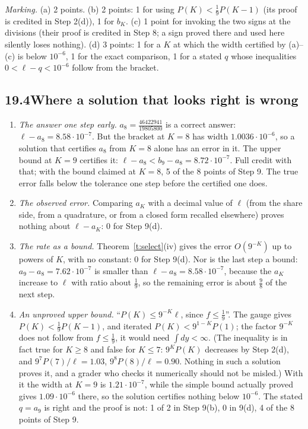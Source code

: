 \documentclass[11pt]{article}
\theoremstyle{plain}
\theoremstyle{definition}
\theoremstyle{remark}
\begin{document}
\smallskip\noindent\emph{Marking.} (a) 2 points. (b) 2 points: 1 for using $P(K)<\frac19P(K-1)$ (its proof is credited in Step 2(d)), 1 for $b_K$. (c) 1 point for invoking the two signs at the divisions (their proof is credited in Step 8; a sign proved there and used here silently loses nothing). (d) 3 points: 1 for a $K$ at which the width certified by (a)--(c) is below $10^{-6}$, 1 for the exact comparison, 1 for a stated $q$ whose inequalities $0<\ell-q<10^{-6}$ follow from the bracket.

\subsection*{19.4\quad Where a solution that looks right is wrong}

\begin{enumerate}[label=\arabic*.]
\item \emph{The answer one step early.} $a_8=\frac{46422941}{19805800}$ is a correct answer: $\ell-a_8=8.58\cdot10^{-7}$. But the bracket at $K=8$ has width $1.0036\cdot10^{-6}$, so a solution that certifies $a_8$ from $K=8$ alone has an error in it. The upper bound at $K=9$ certifies it: $\ell-a_8<b_9-a_8=8.72\cdot10^{-7}$. Full credit with that; with the bound claimed at $K=8$, 5 of the 8 points of Step 9. The true error falls below the tolerance one step before the certified one does.
\item \emph{The observed error.} Comparing $a_K$ with a decimal value of $\ell$ (from the share side, from a quadrature, or from a closed form recalled elsewhere) proves nothing about $\ell-a_K$: 0 for Step 9(d).
\item \emph{The rate as a bound.} Theorem~\ref{t:select}(iv) gives the error $O(9^{-K})$ up to powers of $K$, with no constant: 0 for Step 9(d). Nor is the last step a bound: $a_9-a_8=7.62\cdot10^{-7}$ is smaller than $\ell-a_8=8.58\cdot10^{-7}$, because the $a_K$ increase to $\ell$ with ratio about $\frac19$, so the remaining error is about $\frac98$ of the next step.
\item \emph{An unproved upper bound.} ``$P(K)\le9^{-K}\ell$, since $f\le\frac19$''. The gauge gives $P(K)<\frac19P(K-1)$, and iterated $P(K)<9^{1-K}P(1)$; the factor $9^{-K}$ does not follow from $f\le\frac19$, it would need $\int dy<\infty$. (The inequality is in fact true for $K\ge8$ and false for $K\le7$: $9^KP(K)$ decreases by Step 2(d), and $9^7P(7)/\ell=1.03$, $9^8P(8)/\ell=0.90$. Nothing in such a solution proves it, and a grader who checks it numerically should not be misled.) With it the width at $K=9$ is $1.21\cdot10^{-7}$, while the simple bound actually proved gives $1.09\cdot10^{-6}$ there, so the solution certifies nothing below $10^{-6}$. The stated $q=a_9$ is right and the proof is not: 1 of 2 in Step 9(b), 0 in 9(d), 4 of the 8 points of Step 9.

\end{enumerate}
\end{document}
